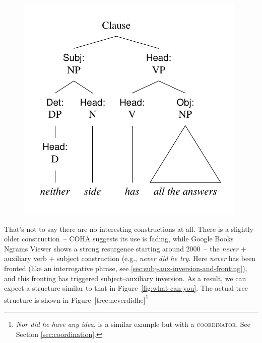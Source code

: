 \begin{figure}
\begin{multicols}{2}
    \centering
    \includegraphics[width=\linewidth]{figures/neitherside.pdf}
    \end{multicols}
\end{figure}

That's not to say there are no interesting constructions at all. There is a slightly older construction~-- COHA suggests its use is fading, while Google Books Ngrams Viewer shows a strong resurgence starting around 2000~-- the \textit{never} + auxiliary verb + subject construction (e.g., \textit{never did he try}. Here \textit{never} has been fronted (like an interrogative phrase, see \ref{sec:subj-aux-inversion-and-fronting}), and this fronting has triggered subject--auxiliary inversion. As a result, we can expect a structure similar to that in Figure~\ref{fig:what-can-you}. The actual tree structure is shown in Figure~\ref{tree:neverdidhe}\footnote{\textit{Nor did he have any idea}, is a similar example but with a \textsc{coordinator}. See Section \ref{sec:coordination}.}

